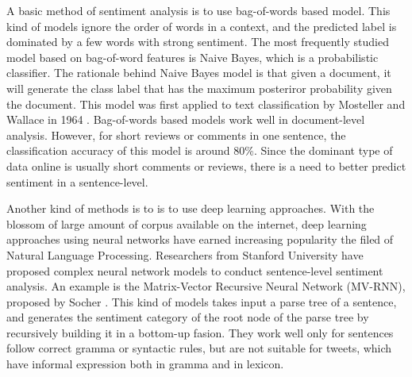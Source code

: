 A basic method of sentiment analysis is to use bag-of-words based model.
%
This kind of models ignore the order of words in a context, and the predicted label is dominated by a few words with strong sentiment.
%
The most frequently studied model based on bag-of-word features is Naive Bayes, which is a probabilistic classifier.
%
The rationale behind Naive Bayes model is that given a document, it will generate the class label that has the maximum posteriror probability given the document.
%
This model was first applied to text classification by Mosteller and Wallace in 1964 \cite{mosteller1964inference}.
%
Bag-of-words based models work well in document-level analysis.
%
However, for short reviews or comments in one sentence, the classification accuracy of this model is around 80\%\cite{wang2012system}.
%
Since the dominant type of data online is usually short comments or reviews, there is a need to better predict sentiment in a sentence-level. 

Another kind of methods is to is to use deep learning approaches.
%
With the blossom of large amount of corpus available on the internet, deep learning approaches using neural networks have earned increasing popularity the filed of Natural Language Processing.
%
Researchers from Stanford University have proposed complex neural network models  to conduct sentence-level sentiment analysis.
%
 An example is the Matrix-Vector Recursive Neural Network (MV-RNN), proposed by Socher \etal \cite{socher2012semantic}.
%
This kind of models takes input a parse tree of a sentence, and generates the sentiment category of the root node of the parse tree by recursively building it in a bottom-up fasion.
%
They work well only for sentences follow correct gramma or syntactic rules, but are not suitable for tweets, which have informal expression both in gramma and in lexicon.
% 



